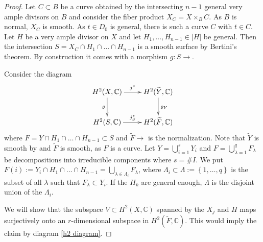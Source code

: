 \documentclass[a4paper,11pt,final]{amsart}
\theoremstyle{plain}
\theoremstyle{definition}
\numberwithin{equation}{section}
\theoremstyle{remark}
\begin{document}
\begin{proof}
Let $C \subset B$ be a curve obtained by the intersecting $n-1$ general very ample divisors on $B$ and consider the fiber product $X_C=X\times_{B} C$. As $B$ is normal, $X_C$ is smooth. As $t\in D_0$ is general, there is such a curve $C$ with $t\in C$. Let $H$ be a very ample divisor on $X$ and let $H_1,\ldots, H_{n-1}\in \left|H\right|$ be general. Then the intersection $S=X_C \cap H_1\cap\ldots\cap H_{n-1}$ is a smooth surface by Bertini's theorem. By construction it comes with a morphism $g:S{\xrightarrow{\ \ }}$. 

Consider the diagram 
\begin{equation}\label{h2 diagram}
\begin{xy}
\xymatrix{
H^2(X,{{\mathbb C}}) \ar[r]^{j^*}\ar[d]_{{\varrho}} & H^2({{\widetilde{Y}}},{{\mathbb C}}) \ar[d]^{{{\varrho}}_Y} \\
H^2(S,{{\mathbb C}}) \ar[r]^{j_S^*} & H^2({{\widetilde{{F}}}},{{\mathbb C}}) \\
}
\end{xy}
\end{equation}
where $F = Y\cap H_1\cap\ldots\cap H_{n-1} \subset S$ and ${{\widetilde{{F}}}}{\xrightarrow{\ \ }}$ is the normalization. Note that ${{\widetilde{Y}}}$ is smooth by \cite[Thm 1.3]{HO07} and ${{\widetilde{F}}}$ is smooth, as $F$ is a curve. Let $Y=\bigcup_{i=1}^s Y_i$ and $F=\bigcup_{\lambda=1}^q F_\lambda$ be decompositions into irreducible components where $s=\# I$. We put
$F(i):= Y_i \cap H_1\cap\ldots\cap H_{n-1} = \bigcup_{\lambda \in \Lambda_i} F_\lambda$,
where $\Lambda_i \subset \Lambda :=\left\{1,\ldots,q\right\}$ is the subset of all $\lambda$ such that $F_\lambda \subset Y_i$. If the $H_k$ are general enough, $\Lambda$ is the disjoint union of the $\Lambda_i$. 

We will show that the subspace $V \subset H^2(X,{{\mathbb C}})$ spanned by the $X_j$ and $H$ maps surjectively onto an $r$-dimensional subspace in $H^2({{\widetilde{F}}},{{\mathbb C}})$. This would imply the claim by diagram \eqref{h2 diagram}.


\end{proof}
\end{document}

